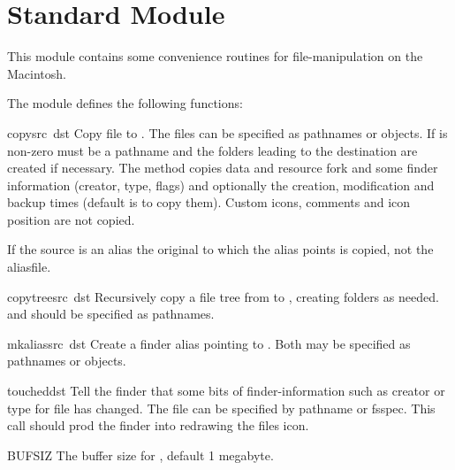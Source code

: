 \section{Standard Module }
\label{module-macostools}

This module contains some convenience routines for file-manipulation
on the Macintosh.

The  module defines the following functions:


\begin{funcdesc}{copy}{src\, dst}
Copy file  to . The files can be specified as
pathnames or  objects. If  is non-zero
 must be a pathname and the folders leading to the
destination are created if necessary.  The method copies data and
resource fork and some finder information (creator, type, flags) and
optionally the creation, modification and backup times (default is to
copy them). Custom icons, comments and icon position are not copied.

If the source is an alias the original to which the alias points is
copied, not the aliasfile.
\end{funcdesc}

\begin{funcdesc}{copytree}{src\, dst}
Recursively copy a file tree from  to , creating
folders as needed.  and  should be specified as
pathnames.
\end{funcdesc}

\begin{funcdesc}{mkalias}{src\, dst}
Create a finder alias  pointing to . Both may be
specified as pathnames or  objects.
\end{funcdesc}

\begin{funcdesc}{touched}{dst}
Tell the finder that some bits of finder-information such as creator
or type for file  has changed. The file can be specified by
pathname or fsspec. This call should prod the finder into redrawing the
files icon.
\end{funcdesc}

\begin{datadesc}{BUFSIZ}
The buffer size for , default 1 megabyte.
\end{datadesc}

